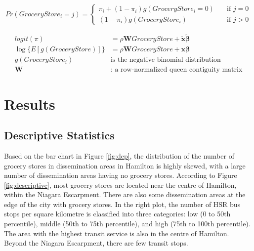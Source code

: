 \documentclass[preprint, 3p,
authoryear]{elsarticle} %
\begin{document}
\begin{equation}
\label{eq:1}
Pr(GroceryStore_i=j) = \begin{cases}
       \pi_i + (1-\pi_i)g(GroceryStore_i=0) &\quad\text{if } j=0\\
       (1-\pi_i)g(GroceryStore_i) &\quad\text{if } j>0
     \end{cases}
\end{equation}

\begin{equation}
\label{eq:2}
\begin{aligned}
logit(\pi) &= \rho \mathbf{W} GroceryStore + \tilde{\mathbf{x}} \tilde{\boldsymbol{\beta}} \\
\log\{E[g(GroceryStore)]\} &= \rho \mathbf{W} GroceryStore + \mathbf{x} \boldsymbol{\beta} \\
g(GroceryStore_i) &\text{is the negative binomial distribution} \\
\mathbf{W} &\text{: a row-normalized queen contiguity matrix}
\end{aligned}
\end{equation}

\section{Results}\label{results}

\subsection{Descriptive Statistics}\label{descriptive-statistics}

Based on the bar chart in Figure \ref{fig:dep}, the distribution of the
number of grocery stores in dissemination areas in Hamilton is highly
skewed, with a large number of dissemination areas having no grocery
stores. According to Figure \ref{fig:descriptive}, most grocery stores
are located near the centre of Hamilton, within the Niagara Escarpment.
There are also some dissemination areas at the edge of the city with
grocery stores. In the right plot, the number of HSR bus stops per
square kilometre is classified into three categories: low (0 to 50th
percentile), middle (50th to 75th percentile), and high (75th to 100th
percentile). The area with the highest transit service is also in the
centre of Hamilton. Beyond the Niagara Escarpment, there are few transit
stops.
\end{document}
